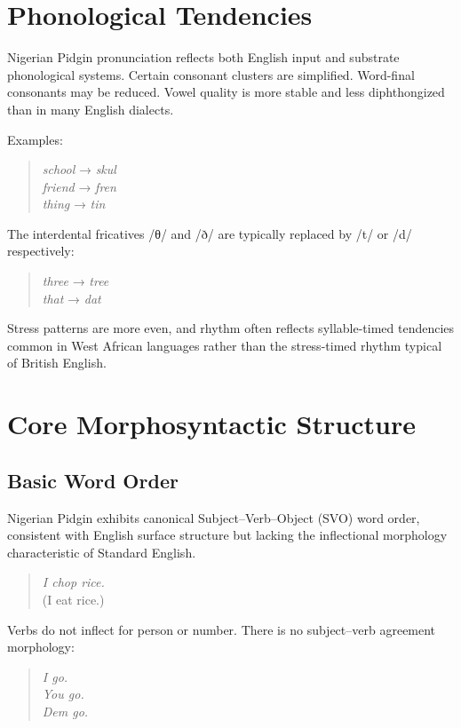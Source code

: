 \documentclass[12pt]{article}
\begin{document}
\section{Phonological Tendencies}

Nigerian Pidgin pronunciation reflects both English input and substrate phonological systems. Certain consonant clusters are simplified. Word-final consonants may be reduced. Vowel quality is more stable and less diphthongized than in many English dialects.

Examples:

\begin{quote}
\textit{school} → \textit{skul} \\
\textit{friend} → \textit{fren} \\
\textit{thing} → \textit{tin}
\end{quote}

The interdental fricatives /θ/ and /ð/ are typically replaced by /t/ or /d/ respectively:

\begin{quote}
\textit{three} → \textit{tree} \\
\textit{that} → \textit{dat}
\end{quote}

Stress patterns are more even, and rhythm often reflects syllable-timed tendencies common in West African languages rather than the stress-timed rhythm typical of British English.

\section{Core Morphosyntactic Structure}

\subsection{Basic Word Order}

Nigerian Pidgin exhibits canonical Subject--Verb--Object (SVO) word order, consistent with English surface structure but lacking the inflectional morphology characteristic of Standard English.

\begin{quote}
\textit{I chop rice.} \\
(I eat rice.)
\end{quote}

Verbs do not inflect for person or number. There is no subject--verb agreement morphology:

\begin{quote}
\textit{I go.} \\
\textit{You go.} \\
\textit{Dem go.}
\end{quote}
\end{document}
